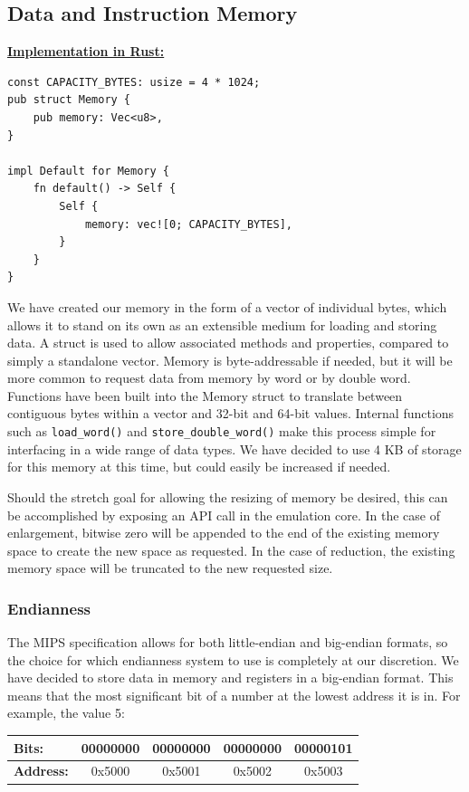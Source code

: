 \documentclass[
    paper=letter,
    parskip=half,
    fontsize=12pt,
    titlepage=firstiscover,
    toc=bibliography,
    numbers=endperiod
]{scrartcl}
\begin{document}
\subsection{Data and Instruction Memory}

\underline{\textbf{Implementation in Rust:}}
\begin{verbatim}
const CAPACITY_BYTES: usize = 4 * 1024;
pub struct Memory {
    pub memory: Vec<u8>,
}

impl Default for Memory {
    fn default() -> Self {
        Self {
            memory: vec![0; CAPACITY_BYTES],
        }
    }
}
\end{verbatim}

We have created our memory in the form of a vector of individual bytes,
which allows it to stand on its own as an extensible medium for loading
and storing data. A struct is used to allow associated methods and
properties, compared to simply a standalone vector. Memory is
byte-addressable if needed, but it will be more common to request data
from memory by word or by double word. Functions have been built into
the Memory struct to translate between contiguous bytes within a vector
and 32-bit and 64-bit values. Internal functions such as
\texttt{load\_word()} and \texttt{store\_double\_word()} make this
process simple for interfacing in a wide range of data types. We have
decided to use 4 KB of storage for this memory at this time, but could
easily be increased if needed.

Should the stretch goal for allowing the resizing of memory be desired,
this can be accomplished by exposing an API call in the emulation core.
In the case of enlargement, bitwise zero will be appended to the end of
the existing memory space to create the new space as requested. In the
case of reduction, the existing memory space will be truncated to the
new requested size.

\subsubsection{Endianness}

The MIPS specification allows for both little-endian and big-endian
formats, so the choice for which endianness system to use is completely
at our discretion. We have decided to store data in memory and registers
in a big-endian format. This means that the most significant bit of a
number at the lowest address it is in. For example, the value 5:

\begin{tabularx}{\textwidth}{|l|c|c|c|c|}
    \hline
    \textbf{Bits:}    & 00000000 & 00000000 & 00000000 & 00000101 \\\hline
    \textbf{Address:} & 0x5000   & 0x5001   & 0x5002   & 0x5003   \\\hline
\end{tabularx}
\end{document}
